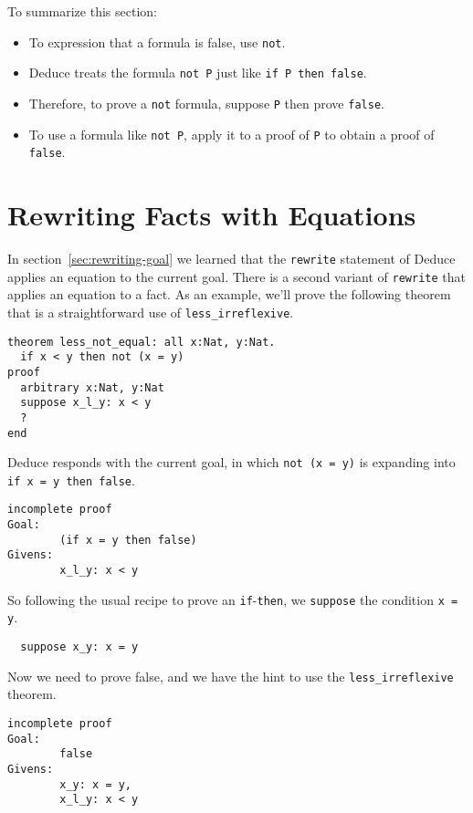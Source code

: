 \documentclass[12pt]{article}
\begin{document}
To summarize this section:
\begin{itemize}
\item To expression that a formula is false, use \texttt{not}.
\item Deduce treats the formula \texttt{not P} just like \texttt{if P
  then false}.
\item Therefore, to prove a \texttt{not} formula, suppose \texttt{P}
  then prove \texttt{false}.
\item To use a formula like \texttt{not P}, apply it to a proof of
  \texttt{P} to obtain a proof of \texttt{false}.
\end{itemize}

\section{Rewriting Facts with Equations}
\label{sec:rewriting-facts}  

In section~\ref{sec:rewriting-goal} we learned that the
\texttt{rewrite} statement of Deduce applies an equation to the
current goal.  There is a second variant of \texttt{rewrite} that
applies an equation to a fact. As an example, we'll prove the
following theorem that is a straightforward use of
\texttt{less\_irreflexive}.

\begin{verbatim}
theorem less_not_equal: all x:Nat, y:Nat.
  if x < y then not (x = y)
proof
  arbitrary x:Nat, y:Nat
  suppose x_l_y: x < y
  ?
end
\end{verbatim}

Deduce responds with the current goal, in which \texttt{not (x = y)} is
expanding into \texttt{if x = y then false}.

\begin{verbatim}
incomplete proof
Goal:
        (if x = y then false)
Givens:
        x_l_y: x < y
\end{verbatim}

So following the usual recipe to prove an \texttt{if}-\texttt{then},
we \texttt{suppose} the condition \texttt{x = y}.

\begin{verbatim}
  suppose x_y: x = y
\end{verbatim}

Now we need to prove false, and we have the hint to use the
\texttt{less\_irreflexive} theorem.

\begin{verbatim}
incomplete proof
Goal:
        false
Givens:
        x_y: x = y,
        x_l_y: x < y
\end{verbatim}
\end{document}
